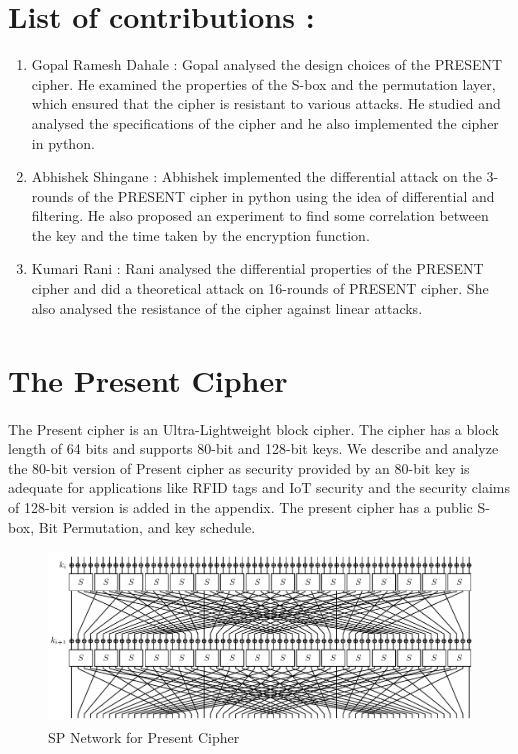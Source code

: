 \documentclass[preprint]{transcrypto}
\begin{document}
\section{List of contributions : }
\begin{enumerate}
    \item Gopal Ramesh Dahale : Gopal analysed the design choices of the PRESENT cipher. He examined the properties of the S-box and the permutation layer, which ensured that the cipher is resistant to various attacks. He studied and analysed the specifications of the cipher and he also implemented the cipher in python. 
    \item Abhishek Shingane : Abhishek implemented the differential attack on the 3-rounds of the PRESENT cipher in python using the idea of differential and filtering. He also proposed an experiment to find some correlation between the key and the time taken by the encryption function.
    \item Kumari Rani : Rani analysed the differential properties of the PRESENT cipher and did a theoretical attack on 16-rounds of PRESENT cipher. She also analysed the resistance of the cipher against linear attacks. 
    
\end{enumerate}

\section{The Present Cipher \textsuperscript{\cite{5}}}
The Present cipher is an Ultra-Lightweight block cipher. The cipher has a block length of 64 bits and supports 80-bit and 128-bit keys. We describe and analyze the 80-bit version of Present cipher as security provided by an 80-bit key is adequate for applications like RFID tags and IoT security and the security claims of 128-bit version is added in the appendix. The present cipher has a public S-box, Bit Permutation, and key schedule.
\\
\begin{figure}[H]
    \centering
    \includegraphics[width=\linewidth]{PRESENT_diagram.pdf}
    \caption{SP Network for Present Cipher \textsuperscript{\cite{5}}}
\end{figure}
\end{document}
